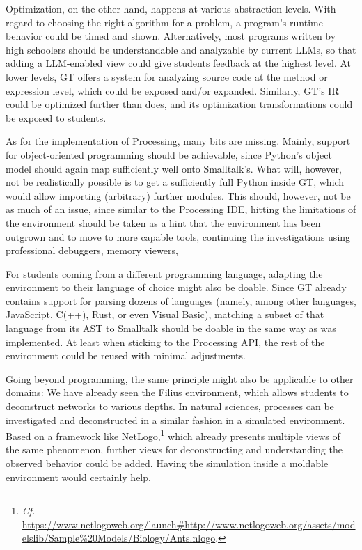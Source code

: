 Optimization, on the other hand, happens at various abstraction levels. With regard to choosing the right algorithm for a problem, a program's runtime behavior could be timed and shown. Alternatively, most programs written by high schoolers should be understandable and analyzable by current \acp{LLM}, so that adding a \ac{LLM}-enabled view could give students feedback at the highest level. At lower levels, \ac{GT} offers a  system for analyzing source code at the method or expression level, which could be exposed and/or expanded. Similarly, \ac{GT}'s \ac{IR} could be optimized further than  does, and its optimization transformations could be exposed to students.

As for the implementation of Processing, many bits are missing. Mainly, support for object-oriented programming should be achievable, since Python's object model should again map sufficiently well onto Smalltalk's. What will, however, not be realistically possible is to get a sufficiently full Python inside \ac{GT}, which would allow importing (arbitrary) further modules. This should, however, not be as much of an issue, since similar to the Processing \ac{IDE}, hitting the limitations of the environment should be taken as a hint that the environment has been outgrown and to move to more capable tools, continuing the investigations using professional debuggers, memory viewers, \etc

For students coming from a different programming language, adapting the environment to their language of choice might also be doable. Since \ac{GT} already contains support for parsing dozens of languages (namely, among other languages, JavaScript, C(++), Rust, or even Visual Basic), matching a subset of that language from its \ac{AST} to Smalltalk should be doable in the same way as  was implemented. At least when sticking to the Processing \ac{API}, the rest of the environment could be reused with minimal adjustments.

Going beyond programming, the same principle might also be applicable to other domains: We have already seen the Filius environment, which allows students to deconstruct networks to various depths. In natural sciences, processes can be investigated and deconstructed in a similar fashion in a simulated environment. Based on a framework like NetLogo,\footnote{\emph{Cf.} \eg \url{https://www.netlogoweb.org/launch\#http://www.netlogoweb.org/assets/modelslib/Sample\%20Models/Biology/Ants.nlogo}.} which already presents multiple views of the same phenomenon, further views for deconstructing and understanding the observed behavior could be added. Having the simulation inside a moldable environment would certainly help.


